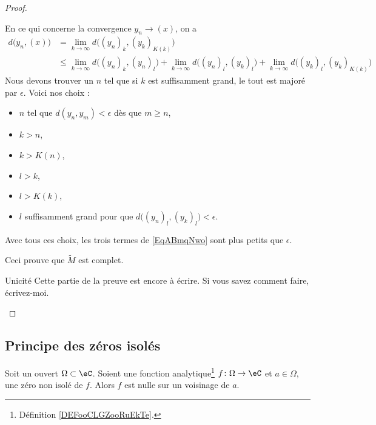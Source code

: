 \begin{proof}
\begin{subproof}
\begin{subproof}
			En ce qui concerne la convergence \( y_n\to (x)\), on a
			\begin{subequations}
				\begin{align}
					d\big( y_n,(x) \big) & =\lim_{k\to \infty} d\big( (y_n)_k,(y_k)_{K(k)} \big)                                                                                                                            \\
					                     & \leq \lim_{k\to \infty} d\big( (y_n)_k,(y_n)_l \big)+\lim_{k\to \infty} d\big( (y_n)_l,(y_k)_{l} \big)+\lim_{k\to \infty} d\big( (y_k)_l,(y_k)_{K(k)} \big)    \label{EqABmqNwo}
				\end{align}
			\end{subequations}
			Nous devons trouver un \( n\) tel que si \( k\) est suffisamment grand, le tout est majoré par \( \epsilon\). Voici nos choix :
			\begin{itemize}
				\item \( n\) tel que \( d(y_n,y_m)<\epsilon\) dès que \( m\geq n\),
				\item \( k>n\),
				\item \( k>K(n)\),
				\item \( l>k\),
				\item \( l>K(k)\),
				\item \( l\) suffisamment grand pour que \( d\big( (y_n)_l,(y_k)_l \big)<\epsilon\).
			\end{itemize}
			Avec tous ces choix, les trois termes de \eqref{EqABmqNwo} sont plus petits que \( \epsilon\).

			Ceci prouve que \( \tilde M\) est complet.
		\end{subproof}
		\item[Unicité]
		Cette partie de la preuve est encore à écrire. Si vous savez comment faire, écrivez-moi.
	\end{subproof}
\end{proof}

\subsection{Principe des zéros isolés}

\begin{theorem}     \label{ThoukDPBX}
	Soit un ouvert \( \Omega\subset \eC\). Soient une fonction analytique\footnote{Définition \ref{DEFooCLGZooRuEkTe}.} \(f\colon \Omega\to \eC \) et \( a\in \Omega\), une zéro non isolé de \( f\). Alors \( f\) est nulle sur un voisinage de \( a\).
\end{theorem}

